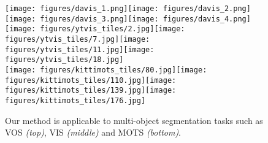 \documentclass[runningheads]{llncs}
\begin{document}
\begin{figure}[t]
\centering
  \texttt{[image: figures/davis\_1.png]}\hspace{1px}\texttt{[image: figures/davis\_2.png]}\hspace{1px}\texttt{[image: figures/davis\_3.png]}\hspace{1px}\texttt{[image: figures/davis\_4.png]}\\
  \texttt{[image: figures/ytvis\_tiles/2.jpg]}\hspace{1px}\texttt{[image: figures/ytvis\_tiles/7.jpg]}\hspace{1px}\texttt{[image: figures/ytvis\_tiles/11.jpg]}\hspace{1px}\texttt{[image: figures/ytvis\_tiles/18.jpg]}\\
  \texttt{[image: figures/kittimots\_tiles/80.jpg]}\hspace{1px}\texttt{[image: figures/kittimots\_tiles/110.jpg]}\hspace{1px}\texttt{[image: figures/kittimots\_tiles/139.jpg]}\hspace{1px}\texttt{[image: figures/kittimots\_tiles/176.jpg]}\\
\raggedleft
{}
    \caption{Our method is applicable to multi-object segmentation tasks such as VOS \textit{(top)}, VIS \textit{(middle)} and MOTS \textit{(bottom)}.}
  \label{fig:teaser}
\end{figure}
\end{document}

